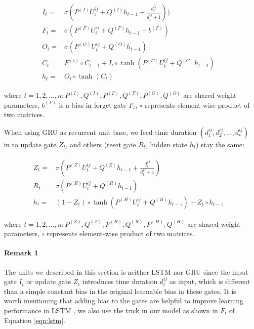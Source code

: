 \begin{align}
\label{eqn:lstm}
\begin{split}
    I_t =& \sigma ( P^{(I)} U^{ij}_t + Q^{(I)} h_{t-1} + \frac{d^{ij}_t}{d^{ij}_t + 1}) ) \\
    F_t =& \sigma ( P^{(F)} U^{ij}_t + Q^{(F)} h_{t-1} + b^{(F)}) \\
    O_t =& \sigma ( P^{(O)} U^{ij}_t + Q^{(O)} h_{t-1} ) \\
    C_t =& F^{(t)} \circ C_{t-1} + I_t \circ \tanh (P^{(C)} U^{ij}_t + Q^{(C)} h_{t-1}) \\
    h_t =& O_t \circ \tanh (C_t)
\end{split}
\end{align}

where $t = 1, 2, ..., n; P^{(I)}, Q^{(I)}, P^{(F)}, Q^{(F)}, P^{(O)}, Q^{(O)}$ are shared weight parameters, 
$b^{(F)}$ is a bias in forget gate $F_t$,
$\circ$ represents element-wise product of two matrices.

When using GRU as recurrent unit base, we feed time duration $(d^{ij}_1, d^{ij}_2, ..., d^{ij}_n)$
in to update gate $Z_t$, and others (reset gate $R_t$, hidden state $h_t$) stay the same:

\begin{align}
\label{eqn:gru}
\begin{split}
    Z_t =& \sigma ( P^{(Z)} U^{ij}_t + Q^{(Z)} h_{t-1} + \frac{d^{ij}_t}{d^{ij}_t + 1} ) \\
    R_t =& \sigma ( P^{(R)} U^{ij}_t + Q^{(R)} h_{t-1} ) \\
    h_t =& ( 1 - Z_t ) \circ \tanh ( P^{(H)} U^{ij}_t + Q^{(H)} h_{t-1} ) + Z_t \circ h_{t-1}
\end{split}
\end{align}

where $t = 1, 2, ..., n; P^{(Z)}, Q^{(Z)}, P^{(R)}, Q^{(R)}, P^{(H)}, Q^{(H)}$ are shared weight parameters, 
$\circ$ represents element-wise product of two matrices.

\paragraph{Remark 1} The units we described in this section is neither LSTM nor GRU since
the input gate $I_t$ or update gate $Z_t$ introduces time duration $d^{ij}_t$ as input,
which is different than a simple constant bias in the original learnable bias in these gates. 
It is worth mentioning that adding bias to the gates are helpful to 
improve learning performance in LSTM \cite{Jozefowicz:2015:EER:3045118.3045367}, 
we also use the trick in our model as shown in $F_t$ of Equation \ref{eqn:lstm}.

